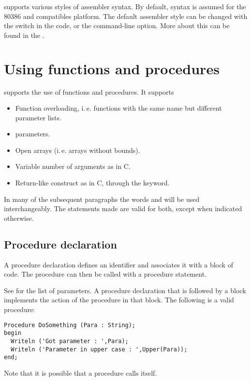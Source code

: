 \fpc supports various styles of assembler syntax. By default, 
syntax is assumed for the 80386 and compatibles platform.
The default assembler style can be changed with the 
switch in the code, or the  command-line option. More about this can
be found in the \progref.


\chapter{Using functions and procedures}
\label{ch:Procedures}
\fpc supports the use of functions and procedures. It supports
\begin{itemize}
\item Function overloading, i.\,e. functions with the same name but different
parameter lists.
\item {} parameters.
\item Open arrays (i.\,e. arrays without bounds).
\item Variable number of arguments as in C.
\item Return-like construct as in C, through the  keyword.
\end{itemize}

\begin{remark} In many of the subsequent paragraphs the words 
and  will be used interchangeably. The statements made are
valid for both, except when indicated otherwise.
\end{remark}

\section{Procedure declaration}
A procedure declaration defines an identifier and associates it with a
block of code. The procedure can then be called with a procedure statement.

See  for the list of parameters.
A procedure declaration that is followed by a block implements the action of
the procedure in that block.
The following is a valid procedure:
\begin{verbatim}
Procedure DoSomething (Para : String);
begin
  Writeln ('Got parameter : ',Para);
  Writeln ('Parameter in upper case : ',Upper(Para));
end;
\end{verbatim}
Note that it is possible that a procedure calls itself.

